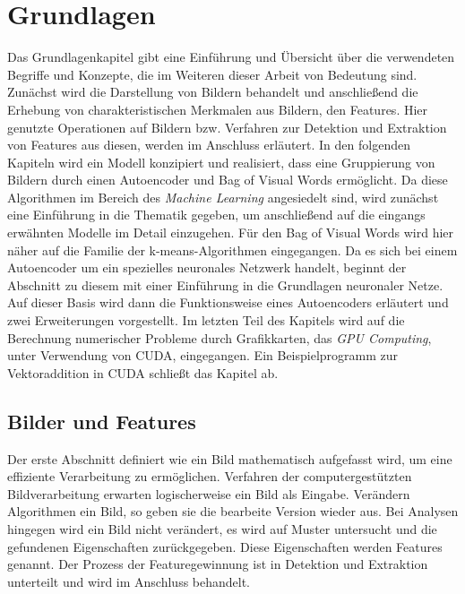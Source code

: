 \chapter{Grundlagen}

Das Grundlagenkapitel gibt eine Einführung und Übersicht über die verwendeten Begriffe und Konzepte, die im Weiteren dieser Arbeit von Bedeutung sind. Zunächst wird die Darstellung von Bildern behandelt und anschließend die Erhebung von charakteristischen Merkmalen aus Bildern, den Features. Hier genutzte Operationen auf Bildern bzw. Verfahren zur Detektion und Extraktion von Features aus diesen, werden im Anschluss erläutert.\newline
In den folgenden Kapiteln wird ein Modell konzipiert und realisiert, dass eine Gruppierung von Bildern durch einen Autoencoder und Bag of Visual Words ermöglicht. Da diese Algorithmen im Bereich des \textit{Machine Learning} angesiedelt sind, wird zunächst eine Einführung in die Thematik gegeben, um anschließend auf die eingangs erwähnten Modelle im Detail einzugehen. Für den Bag of Visual Words wird hier näher auf die Familie der k-means-Algorithmen eingegangen. Da es sich bei einem Autoencoder um ein spezielles neuronales Netzwerk handelt, beginnt der Abschnitt zu diesem mit einer Einführung in die Grundlagen neuronaler Netze. Auf dieser Basis wird dann die Funktionsweise eines Autoencoders erläutert und zwei Erweiterungen vorgestellt.\newline
Im letzten Teil des Kapitels wird auf die Berechnung numerischer Probleme durch Grafikkarten, das \textit{GPU Computing}, unter Verwendung von CUDA, eingegangen. Ein Beispielprogramm zur Vektoraddition in CUDA schließt das Kapitel ab.

\section{Bilder und Features}

Der erste Abschnitt definiert wie ein Bild mathematisch aufgefasst wird, um eine effiziente Verarbeitung zu ermöglichen. Verfahren der computergestützten Bildverarbeitung erwarten logischerweise ein Bild als Eingabe. Verändern Algorithmen ein Bild, so geben sie die bearbeite Version wieder aus. Bei Analysen hingegen wird ein Bild nicht verändert, es wird auf Muster untersucht und die gefundenen Eigenschaften zurückgegeben. Diese Eigenschaften werden Features genannt. Der Prozess der Featuregewinnung ist in Detektion und Extraktion unterteilt und wird im Anschluss behandelt.


